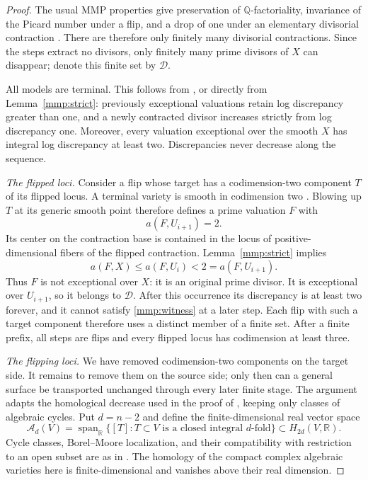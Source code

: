 \begin{proof}
The usual MMP properties give preservation of $\mathbb Q$-factoriality,
invariance of the Picard number under a flip, and a drop of one under
an elementary divisorial contraction
\cite[Propositions~3.36--3.37]{KM98}.
There are therefore only finitely many divisorial contractions.
Since the steps extract no divisors, only finitely many prime divisors
of $X$ can disappear; denote this finite set by $\mathcal D$.

All models are terminal.  This follows from
\cite[Corollaries~3.42--3.43]{KM98}, or directly from
Lemma~\ref{mmp:strict}: previously exceptional valuations retain
log discrepancy greater than one, and a newly contracted divisor
increases strictly from log discrepancy one.  Moreover, every
valuation exceptional over the smooth $X$ has integral log
discrepancy at least two.  Discrepancies never decrease along the
sequence.

\smallskip\noindent
\emph{The flipped loci.}
Consider a flip whose target has a codimension-two component $T$
of its flipped locus.  A terminal variety is smooth in codimension
two \cite[Corollary~5.18]{KM98}.  Blowing up $T$ at its generic
smooth point therefore defines a prime valuation $F$ with
\[
 a(F,U_{i+1})=2.
\]
Its center on the contraction base is contained in the locus of
positive-dimensional fibers of the flipped contraction.
Lemma~\ref{mmp:strict} implies
\begin{equation}\label{mmp:witness}
 a(F,X)\leq a(F,U_i)<2=a(F,U_{i+1}).
\end{equation}
Thus $F$ is not exceptional over $X$: it is an original prime divisor.
It is exceptional over $U_{i+1}$, so it belongs to $\mathcal D$.
After this occurrence its discrepancy is at least two forever,
and it cannot satisfy \eqref{mmp:witness} at a later step.
Each flip with such a target component therefore uses a distinct
member of a finite set.  After a finite prefix, all steps are flips
and every flipped locus has codimension at least three.

\smallskip\noindent
\emph{The flipping loci.}
We have removed codimension-two components on the target side. It remains
to remove them on the source side; only then can a general surface be
transported unchanged through every later finite stage. The argument
adapts the homological decrease used in the proof of
\cite[Lemma~3.1]{AHK07}, keeping only classes of algebraic cycles.
Put $d=n-2$ and
define the finite-dimensional real vector space
\[
 \mathcal A_d(V)
 =\operatorname{span}_{\mathbb R}
 \{[T]:T\subset V\text{ is a closed integral $d$-fold}\}
 \subset H_{2d}(V,\mathbb R).
\]
Cycle classes,
Borel--Moore localization, and their compatibility with restriction
to an open subset are as in \cite[Section~19.1]{Fulton98}.
The homology of the compact complex algebraic varieties here is
finite-dimensional and vanishes above their real dimension.


\end{proof}
